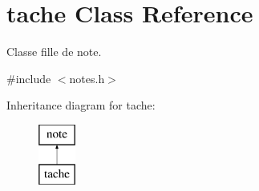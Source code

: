 \hypertarget{classtache}{}\section{tache Class Reference}
\label{classtache}


Classe fille de note.  




{\ttfamily \#include $<$notes.\+h$>$}

Inheritance diagram for tache\+:\begin{figure}[H]
\begin{center}
\leavevmode
\includegraphics[height=2.000000cm]{classtache}
\end{center}
\end{figure}

